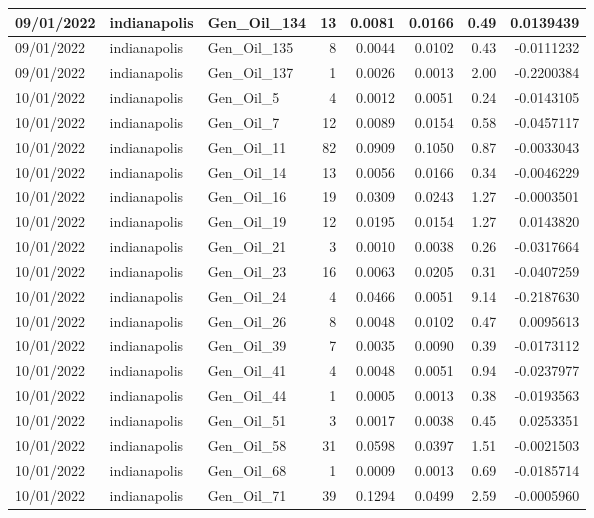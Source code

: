 \documentclass[
  letterpaper,
  DIV=11,
  numbers=noendperiod]{scrartcl}
\begin{document}
\begin{tabular}{l|l|l|r|r|r|r|r}
\hline
09/01/2022 & indianapolis & Gen\_Oil\_134 & 13 & 0.0081 & 0.0166 & 0.49 & 0.0139439\\
\hline
09/01/2022 & indianapolis & Gen\_Oil\_135 & 8 & 0.0044 & 0.0102 & 0.43 & -0.0111232\\
\hline
09/01/2022 & indianapolis & Gen\_Oil\_137 & 1 & 0.0026 & 0.0013 & 2.00 & -0.2200384\\
\hline
10/01/2022 & indianapolis & Gen\_Oil\_5 & 4 & 0.0012 & 0.0051 & 0.24 & -0.0143105\\
\hline
10/01/2022 & indianapolis & Gen\_Oil\_7 & 12 & 0.0089 & 0.0154 & 0.58 & -0.0457117\\
\hline
10/01/2022 & indianapolis & Gen\_Oil\_11 & 82 & 0.0909 & 0.1050 & 0.87 & -0.0033043\\
\hline
10/01/2022 & indianapolis & Gen\_Oil\_14 & 13 & 0.0056 & 0.0166 & 0.34 & -0.0046229\\
\hline
10/01/2022 & indianapolis & Gen\_Oil\_16 & 19 & 0.0309 & 0.0243 & 1.27 & -0.0003501\\
\hline
10/01/2022 & indianapolis & Gen\_Oil\_19 & 12 & 0.0195 & 0.0154 & 1.27 & 0.0143820\\
\hline
10/01/2022 & indianapolis & Gen\_Oil\_21 & 3 & 0.0010 & 0.0038 & 0.26 & -0.0317664\\
\hline
10/01/2022 & indianapolis & Gen\_Oil\_23 & 16 & 0.0063 & 0.0205 & 0.31 & -0.0407259\\
\hline
10/01/2022 & indianapolis & Gen\_Oil\_24 & 4 & 0.0466 & 0.0051 & 9.14 & -0.2187630\\
\hline
10/01/2022 & indianapolis & Gen\_Oil\_26 & 8 & 0.0048 & 0.0102 & 0.47 & 0.0095613\\
\hline
10/01/2022 & indianapolis & Gen\_Oil\_39 & 7 & 0.0035 & 0.0090 & 0.39 & -0.0173112\\
\hline
10/01/2022 & indianapolis & Gen\_Oil\_41 & 4 & 0.0048 & 0.0051 & 0.94 & -0.0237977\\
\hline
10/01/2022 & indianapolis & Gen\_Oil\_44 & 1 & 0.0005 & 0.0013 & 0.38 & -0.0193563\\
\hline
10/01/2022 & indianapolis & Gen\_Oil\_51 & 3 & 0.0017 & 0.0038 & 0.45 & 0.0253351\\
\hline
10/01/2022 & indianapolis & Gen\_Oil\_58 & 31 & 0.0598 & 0.0397 & 1.51 & -0.0021503\\
\hline
10/01/2022 & indianapolis & Gen\_Oil\_68 & 1 & 0.0009 & 0.0013 & 0.69 & -0.0185714\\
\hline
10/01/2022 & indianapolis & Gen\_Oil\_71 & 39 & 0.1294 & 0.0499 & 2.59 & -0.0005960\\

\end{tabular}
\end{document}
